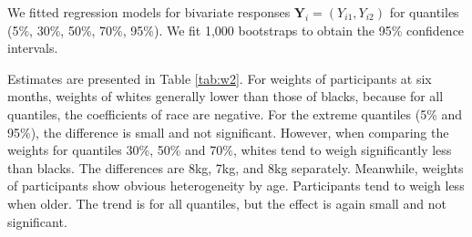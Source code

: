 \documentclass[12pt]{article}
\begin{document}
We fitted regression models for bivariate responses $\bm Y_i =
(Y_{i1}, Y_{i2})$ for quantiles (5\%, 30\%, 50\%, 70\%, 95\%).  We fit
1,000 bootstraps to obtain the 95\% confidence intervals.

Estimates are presented in Table \ref{tab:w2}. For weights of
participants at six months, weights of whites generally lower than
those of blacks, because for all quantiles, the coefficients of race
are negative. For the extreme quantiles (5\% and 95\%), the difference
is small and not significant. However, when comparing the weights for
quantiles 30\%, 50\% and 70\%, whites tend to weigh significantly less
than blacks. The differences are 8kg, 7kg, and 8kg
separately. Meanwhile, weights of participants show obvious
heterogeneity by age. Participants tend to weigh less when older. The
trend is for all quantiles, but the effect is again small and not
significant.
\end{document}
